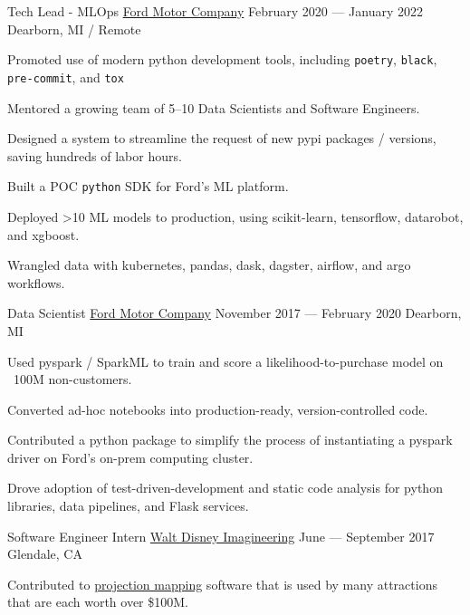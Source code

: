 \documentclass[letterpaper]{resume_config}
\newcommand{\code}[1]{\colorbox{light-gray}{\texttt{#1}}}
\begin{document}
\WorkExperience
    {Tech Lead - MLOps} %
    {\href{https://www.ford.com/}{Ford Motor Company}} %
    {February 2020 --- January 2022} %
    {Dearborn, MI / Remote} %
    {
        \item Promoted use of modern python development tools, including \code{poetry}, \code{black}, \code{pre-commit}, and \code{tox}
        \item Mentored a growing team of 5--10 Data Scientists and Software Engineers.
        \item Designed a system to streamline the request of new pypi packages / versions, saving hundreds of labor hours. 
        \item Built a POC \code{python} SDK for Ford's ML platform.
        \item Deployed >10 ML models to production, using scikit-learn, tensorflow, datarobot, and xgboost.
        \item Wrangled data with kubernetes, pandas, dask, dagster, airflow, and argo workflows.
    }

\WorkExperience
    {Data Scientist} %
    {\href{https://www.ford.com/}{Ford Motor Company}} %
    {November 2017 --- February 2020} %
    {Dearborn, MI} %
    {
        \item Used pyspark / SparkML to train and score a likelihood-to-purchase model on ~100M non-customers.
        \item Converted ad-hoc notebooks into production-ready, version-controlled code.
        \item Contributed a python package to simplify the process of instantiating a pyspark driver on Ford's on-prem computing cluster.
        \item Drove adoption of test-driven-development and static code analysis for python libraries, data pipelines, and Flask services.
    }

\WorkExperience
    {Software Engineer Intern} %
    {\href{https://sites.disney.com/waltdisneyimagineering/}{Walt Disney Imagineering}} %
    {June --- September 2017} %
    {Glendale, CA} %
    {
        \item Contributed to \href{https://en.wikipedia.org/wiki/Projection_mapping}{projection mapping} software that is used by many attractions that are each worth over \$100M.
    }
\end{document}
